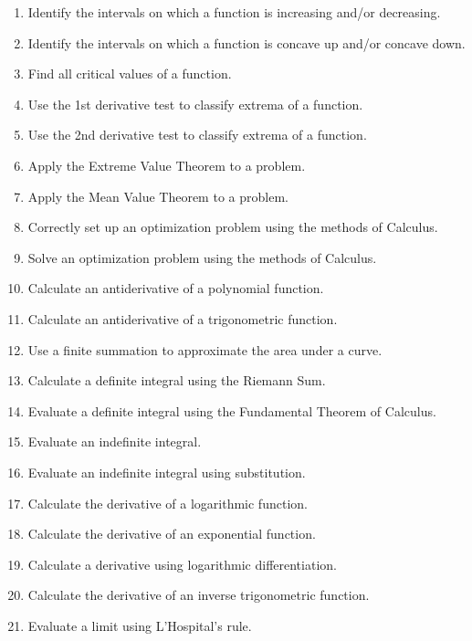 \documentclass[12pt,landscape]{article}
\begin{document}
\begin{multicols}{2}
\begin{enumerate}
\item Identify the intervals on which a function is increasing and/or decreasing.\\
\item Identify the intervals on which a function is concave up and/or concave down.\\
\item Find all critical values of a function.\\
\item Use the 1st derivative test to classify extrema of a function. \\
\item Use the 2nd derivative test to classify extrema of a function.\\
\item Apply the Extreme Value Theorem to a problem.\\
\item Apply the Mean Value Theorem to a problem.\\
\item Correctly set up an optimization problem using the methods of Calculus.\\
\item Solve an optimization problem using the methods of Calculus.\\
\item Calculate an antiderivative of a polynomial function.\\
\item Calculate an antiderivative of a trigonometric function.\\
\item Use a finite summation to approximate the area under a curve.\\
\item Calculate a definite integral using the Riemann Sum.\\
\item Evaluate a definite integral using the Fundamental Theorem of Calculus.\\
\item Evaluate an indefinite integral.\\
\item Evaluate an indefinite integral using substitution.\\
\item Calculate the derivative of a logarithmic function.\\
\item Calculate the derivative of an exponential function.\\
\item Calculate a derivative using logarithmic differentiation.\\
\item Calculate the derivative of an inverse trigonometric function.\\
\item Evaluate a limit using L'Hospital's rule.\\
\end{enumerate}
\newpage 
\begin{comment}

\end{comment}
\end{multicols}
\end{document}
